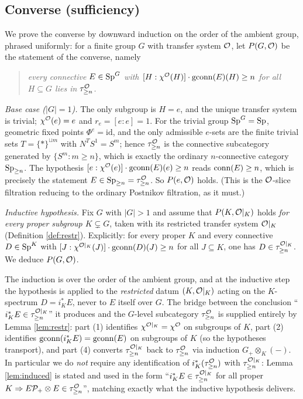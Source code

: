 \subsection*{Converse (sufficiency)}

We prove the converse by downward induction on the order of the ambient group,
phrased uniformly: for a finite group $G$ with transfer system $\mathcal{O}$, let
$P(G,\mathcal{O})$ be the statement of the converse, namely
\begin{quote}
\emph{every connective $E\in\mathrm{Sp}^G$ with $[H:\chi^{\mathcal{O}}(H)]\cdot\operatorname{gconn}(E)(H)\ge n$
for all $H\subseteq G$ lies in $\tau^{\mathcal{O}}_{\ge n}$.}
\end{quote}
\medskip
\noindent\emph{Base case ($|G|=1$).} The only subgroup is $H=e$, and the unique
transfer system is trivial; $\chi^{\mathcal{O}}(e)=e$ and $r_e=[e:e]=1$. For the trivial
group $\mathrm{Sp}^G=\mathrm{Sp}$, geometric fixed points $\Phi^e=\mathrm{id}$, and the only
admissible $e$-sets are the finite trivial sets $T=\{\ast\}^{\sqcup m}$ with
$N^TS^1=S^m$; hence $\tau^{\mathcal{O}}_{\ge n}$ is the connective subcategory generated by
$\{S^m:m\ge n\}$, which is exactly the ordinary $n$-connective category
$\mathrm{Sp}_{\ge n}$. The hypothesis $[e:\chi^{\mathcal{O}}(e)]\cdot\operatorname{gconn}(E)(e)\ge n$ reads
$\operatorname{conn}(E)\ge n$, which is precisely the statement $E\in\mathrm{Sp}_{\ge n}=
\tau^{\mathcal{O}}_{\ge n}$. So $P(e,\mathcal{O})$ holds. (This is the $\mathcal{O}$-slice filtration
reducing to the ordinary Postnikov filtration, as it must.)

\medskip
\noindent\emph{Inductive hypothesis.} Fix $G$ with $|G|>1$ and assume that
$P(K,\mathcal{O}|_K)$ holds \emph{for every proper subgroup $K\subsetneq G$}, taken with
its restricted transfer system $\mathcal{O}|_K$ (Definition \ref{def:restr}). Explicitly:
for every proper $K$ and every connective $D\in\mathrm{Sp}^K$ with
$[J:\chi^{\mathcal{O}|_K}(J)]\cdot\operatorname{gconn}(D)(J)\ge n$ for all $J\subseteq K$, one has
$D\in\tau^{\mathcal{O}|_K}_{\ge n}$. We deduce $P(G,\mathcal{O})$.

\begin{qfiveremark}\label{rem:ind-link}
The induction is over the order of the ambient group, and at the inductive step
the hypothesis is applied to the \emph{restricted} datum $(K,\mathcal{O}|_K)$ acting on
the $K$-spectrum $D=i_K^\ast E$, never to $E$ itself over $G$. The bridge between
the conclusion ``$i_K^\ast E\in\tau^{\mathcal{O}|_K}_{\ge n}$'' it produces and the
$G$-level subcategory $\tau^{\mathcal{O}}_{\ge n}$ is supplied entirely by Lemma
\ref{lem:restr}: part (1) identifies $\chi^{\mathcal{O}|_K}=\chi^{\mathcal{O}}$ on subgroups of
$K$, part (2) identifies $\operatorname{gconn}(i_K^\ast E)=\operatorname{gconn}(E)$ on subgroups of $K$
(so the hypotheses transport), and part (4) converts $\tau^{\mathcal{O}|_K}_{\ge n}$ back
to $\tau^{\mathcal{O}}_{\ge n}$ via induction $G_+\otimes_K(-)$. In particular we do
\emph{not} require any identification of $i_K^\ast(\tau^{\mathcal{O}}_{\ge n})$ with
$\tau^{\mathcal{O}|_K}_{\ge n}$: Lemma \ref{lem:induced} is stated and used in the form
``$i_K^\ast E\in\tau^{\mathcal{O}|_K}_{\ge n}$ for all proper $K\Rightarrow E\mathcal
P_+\otimes E\in\tau^{\mathcal{O}}_{\ge n}$'', matching exactly what the inductive hypothesis
delivers.
\end{qfiveremark}

